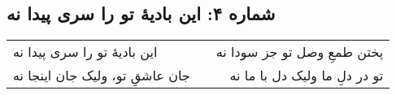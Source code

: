 \begin{center}
\section*{شماره ۴: این بادیۀ تو را سری پیدا نه}
\label{sec:004}
\begin{longtable}{l p{0.5cm} r}
این بادیهٔ تو را سری پیدا نه
&&
پختن طمعِ وصل تو جز سودا نه
\\
جان عاشقِ تو، ولیک جان اینجا نه
&&
تو در دلِ ما ولیک دل با ما نه
\\
\end{longtable}
\end{center}
